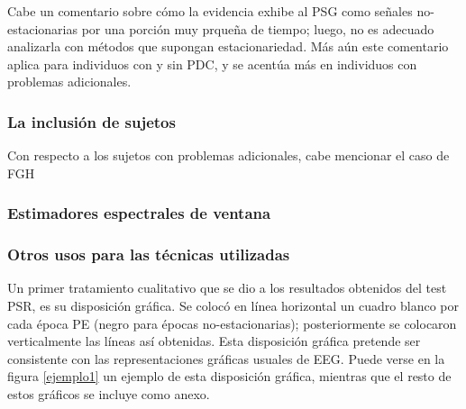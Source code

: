 Cabe un comentario sobre c\'omo la evidencia exhibe al PSG como se\~nales no-estacionarias
por una porci\'on muy prque\~na de tiempo; luego, no es adecuado analizarla con m\'etodos que
supongan estacionariedad. M\'as a\'un este comentario aplica para individuos con y sin PDC, y
se acent\'ua m\'as en individuos con problemas adicionales.

\subsubsection{La inclusi\'on de sujetos}

Con respecto a los sujetos con problemas adicionales, cabe mencionar el caso de FGH


\subsubsection{Estimadores espectrales de ventana}

\subsubsection{Otros usos para las t\'ecnicas utilizadas}


Un primer tratamiento cualitativo que se dio a los resultados obtenidos del test PSR, es su
disposici\'on gr\'afica.
Se coloc\'o en l\'inea horizontal un cuadro blanco por cada
\'epoca PE (negro para \'epocas no-estacionarias);
posteriormente se colocaron verticalmente las
l\'ineas as\'i obtenidas.
Esta disposici\'on gr\'afica pretende ser consistente con las representaciones gr\'aficas
usuales de EEG.
Puede verse en la figura \ref{ejemplo1} un ejemplo de esta disposici\'on gr\'afica, mientras
que el resto de estos gr\'aficos se incluye como anexo.

